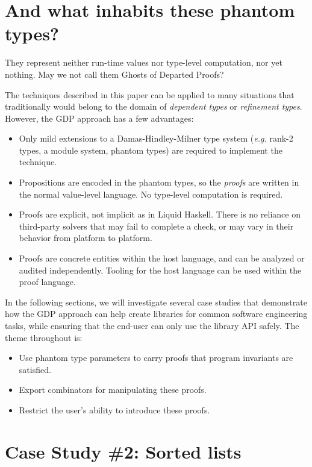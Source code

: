 \documentclass[format=sigplan, review=false, screen=true]{acmart}
\begin{document}
\section{And what inhabits these phantom types?}
They represent neither run-time values nor type-level computation, nor yet nothing.
May we not call them Ghosts of Departed Proofs?

The techniques described in this paper can be applied to many
situations that traditionally would belong to the domain of
\emph{dependent types} or \emph{refinement types}. However, the
GDP approach has a few advantages:
\begin{itemize}
\item Only mild extensions to a Damas-Hindley-Milner type system
  ({\it e.g.} rank-2 types, a module system, phantom types) are required to
  implement the technique.
\item Propositions are encoded in the phantom types, so the
  \emph{proofs} are written in the normal value-level language.
  No type-level computation is required.
\item Proofs are explicit, not implicit as in Liquid Haskell. There is
  no reliance on third-party solvers that may fail to complete a check,
  or may vary in their behavior from platform to platform.
\item Proofs are concrete entities within the host language, and can
  be analyzed or audited independently. Tooling for the host language
  can be used within the proof language.
\end{itemize}

In the following sections, we will investigate several case studies that
demonstrate how the GDP approach can help create libraries for common
software engineering tasks, while ensuring that the end-user can only
use the library API safely. The theme throughout is:
\begin{itemize}
\item Use phantom type parameters to carry proofs that program invariants are satisfied.
\item Export combinators for manipulating these proofs.
\item Restrict the user's ability to introduce these proofs.
\end{itemize}

\section{Case Study \#2: Sorted lists}
\end{document}
